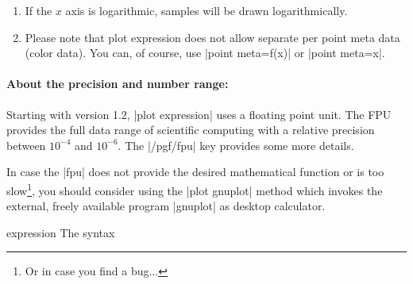 {\begin{addplotoperation}[]{}{}
\begin{enumerate}
	Please note, however, that trigonometric functions are defined in degrees. The character `|^|' is used for exponentiation (not `|**|' as in gnuplot).

	\item If the $x$ axis is logarithmic, samples will be drawn logarithmically.

	\item Please note that plot expression does not allow separate per point meta data (color data). You can, of course, use |point meta=f(x)| or |point meta=x|.
\end{enumerate}

\paragraph{About the precision and number range:}
%
%
	 Starting with version 1.2, |plot expression| uses a floating point unit. The FPU provides the full data range of scientific computing with a relative precision between $10^{-4}$ and $10^{-6}$. The |/pgf/fpu| key provides some more details. 

	In case the |fpu| does not provide the desired mathematical function or is too slow\footnote{Or in case you find a bug$\dotsc$}, you should consider using the |plot gnuplot| method which invokes the external, freely available program |gnuplot| as desktop calculator. 

\begin{codeexample}[]
\end{codeexample}

\begin{codeexample}[]
\end{codeexample}
\end{addplotoperation}

\begin{addplotoperation}[]{expression}{}
	The syntax


\end{addplotoperation}}
